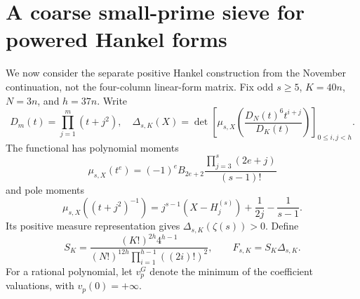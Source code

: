 \section{A coarse small-prime sieve for powered Hankel forms}
\label{sec:coarse-hankel-sieve}

We now consider the separate positive Hankel construction from the
November continuation, not the four-column linear-form matrix.
Fix odd $s\ge5$, $K=40n$, $N=3n$, and $h=37n$. Write
\[
 D_m(t)=\prod_{j=1}^m(t+j^2),\quad
 \Delta_{s,K}(X)=\det\left[
 \mu_{s,X}\left(\frac{D_N(t)^6t^{i+j}}{D_K(t)}\right)
 \right]_{0\le i,j<h}.
\]
The functional has polynomial moments
\[
 \mu_{s,X}(t^e)=(-1)^e B_{2e+2}
 \frac{\prod_{j=3}^s(2e+j)}{(s-1)!}
\]
and pole moments
\[
 \mu_{s,X}((t+j^2)^{-1})=
 j^{s-1}(X-H_j^{(s)})+\frac1{2j}-\frac1{s-1}.
\]
Its positive measure representation gives
$\Delta_{s,K}(\zeta(s))>0$. Define
\[
 S_K=\frac{(K!)^{2h}4^{h-1}}
 {(N!)^{12h}\prod_{i=1}^{h-1}((2i)!)^2},\qquad
 F_{s,K}=S_K\Delta_{s,K}.
\]
For a rational polynomial, let $v_p^G$ denote the minimum of the
coefficient valuations, with $v_p(0)=+\infty$.


